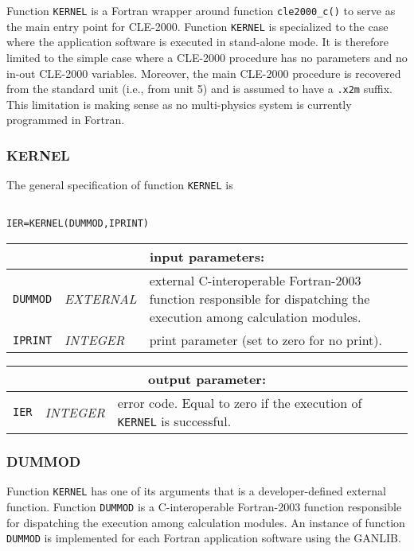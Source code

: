 Function {\tt KERNEL} is a Fortran wrapper around function {\tt cle2000\_c()} to serve as the main entry point for CLE-2000.
Function {\tt KERNEL} is specialized to the case where the application software is executed in stand-alone mode. It is
therefore limited to the simple case where a CLE-2000 procedure has no parameters and no in-out CLE-2000 variables.
Moreover, the main CLE-2000 procedure is recovered from the standard unit (i.e., from unit 5) and is assumed to have a {\tt .x2m}
suffix. This limitation is making sense as no multi-physics system is currently programmed in Fortran.

\subsubsection{KERNEL}

The general specification of function {\tt KERNEL} is

\begin{verbatim}

IER=KERNEL(DUMMOD,IPRINT)
\end{verbatim}

\vskip 0.8cm

\noindent
\begin{tabular}{|p{1.5cm}|p{3cm}|p{10cm}|}
\hline
\multicolumn{3}{|c|}{\bf input parameters:} \\
\hline
{\tt DUMMOD} & {\it EXTERNAL} & external C-interoperable Fortran-2003 function responsible for dispatching the execution among calculation modules.   \\
\hline
{\tt IPRINT} & {\it INTEGER} & print parameter (set to zero for no print). \\
\hline
\end{tabular}

\vskip 0.4cm
\noindent
\begin{tabular}{|p{1.5cm}|p{3cm}|p{10cm}|}
\hline
\multicolumn{3}{|c|}{\bf output parameter:} \\
\hline
{\tt IER} & {\it INTEGER}  &  error code. Equal to zero if the execution of {\tt KERNEL} is successful.   \\
\hline
\end{tabular}

\subsubsection{DUMMOD}

Function {\tt KERNEL} has one of its arguments that is a developer-defined external function. Function {\tt DUMMOD} is a C-interoperable Fortran-2003 function responsible for dispatching the execution among calculation modules. An instance of function {\tt DUMMOD} is implemented for 
each Fortran application software using the GANLIB.


